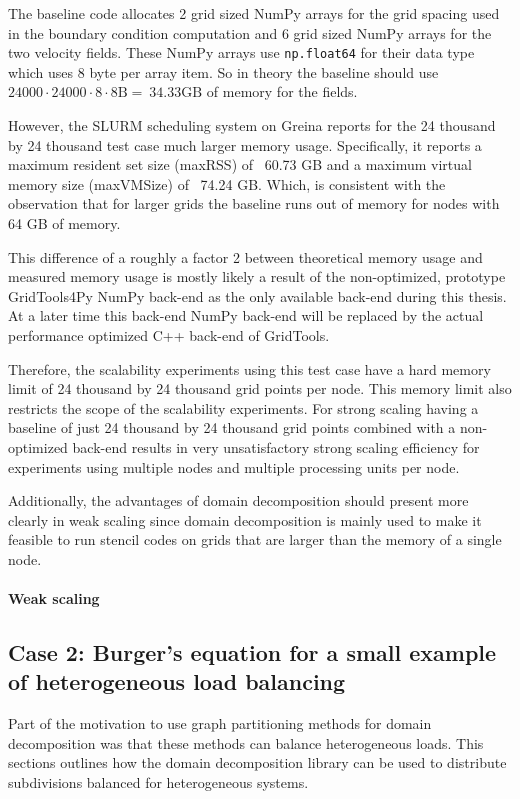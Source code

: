 The baseline code allocates 2 grid sized NumPy arrays for the grid spacing used in the boundary condition computation and 6 grid sized NumPy arrays for the two velocity fields.
These NumPy arrays use \texttt{np.float64} for their data type which uses 8 byte per array item.
So in theory the baseline should use $24000 \cdot 24000 \cdot 8 \cdot 8 \text{B} = ~34.33 \text{GB}$ of memory for the fields.

However, the SLURM scheduling system on Greina reports for the 24 thousand by 24 thousand test case much larger memory usage.
Specifically, it reports a maximum resident set size (maxRSS) of ~60.73 GB and a maximum virtual memory size (maxVMSize) of ~74.24 GB.
Which, is consistent with the observation that for larger grids the baseline runs out of memory for nodes with 64 GB of memory.

This difference of a roughly a factor 2 between theoretical memory usage and measured memory usage is mostly likely a result of the non-optimized, prototype GridTools4Py NumPy back-end as the only available back-end during this thesis.
At a later time this back-end NumPy back-end will be replaced by the actual performance optimized C++ back-end of GridTools.

Therefore, the scalability experiments using this test case have a hard memory limit of 24 thousand by 24 thousand grid points per node.
This memory limit also restricts the scope of the scalability experiments.
For strong scaling having a baseline of just 24 thousand by 24 thousand grid points combined with a non-optimized back-end results in very unsatisfactory strong scaling efficiency for experiments using multiple nodes and multiple processing units per node.

Additionally, the advantages of domain decomposition should present more clearly in weak scaling since domain decomposition is mainly used to make it feasible to run stencil codes on grids that are larger than the memory of a single node.

\paragraph{Weak scaling}


\newpage
\subsection{Case 2: Burger's equation for a small example of  heterogeneous load balancing}
Part of the motivation to use graph partitioning methods for domain decomposition was that these methods can balance heterogeneous loads.
This sections outlines how the domain decomposition library can be used to distribute subdivisions balanced for heterogeneous systems.

